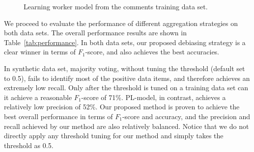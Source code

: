 \begin{figure}[!t]
  \centering
  \caption{\label{fig:lnkd_training}
  Learning worker model from the comments training data set.
  }
\end{figure}


We proceed to evaluate the performance of different aggregation strategies on both data sets.  
The overall performance results are shown in Table~\ref{tab:performance}.  
In both data sets, our proposed debiasing strategy is a clear winner in terms of $F_1$-score, 
and also achieves the best accuracies.  

In synthetic data set, majority voting, without tuning the threshold (default set to 0.5), fails to identify most of the positive data items, 
and therefore achieves an extremely low recall.  
Only after the threshold is tuned on a training data set 
can it achieve a reasonable $F_1$-score of 71\%.  
PL-model, in contrast, achieves a relatively low precision of 52\%.  
Our proposed method is proven to achieve the best overall performance in terms of $F_1$-score and accuracy, 
and the precision and recall achieved by our method are also relatively balanced.  
Notice that we do not directly apply any threshold tuning for our method and simply takes the threshold as 0.5.  


